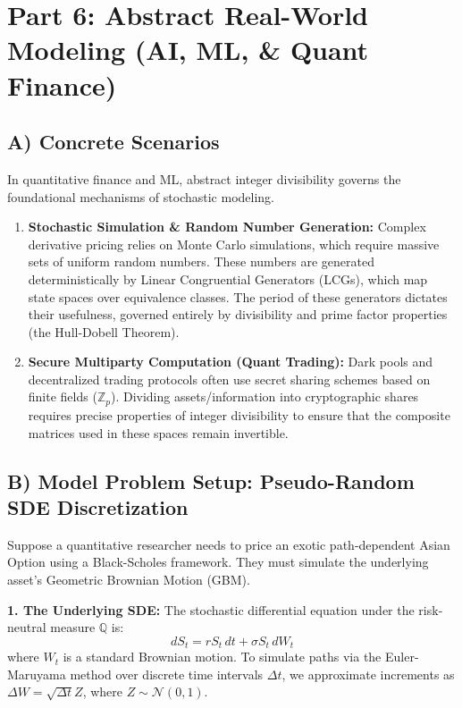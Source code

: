\documentclass[11pt]{article}
\theoremstyle{definition}
\theoremstyle{remark}
\begin{document}
\section{Part 6: Abstract Real-World Modeling (AI, ML, \& Quant Finance)}

\subsection{A) Concrete Scenarios}
In quantitative finance and ML, abstract integer divisibility governs the foundational mechanisms of stochastic modeling.
\begin{enumerate}
    \item \textbf{Stochastic Simulation \& Random Number Generation:} Complex derivative pricing relies on Monte Carlo simulations, which require massive sets of uniform random numbers. These numbers are generated deterministically by Linear Congruential Generators (LCGs), which map state spaces over equivalence classes. The period of these generators dictates their usefulness, governed entirely by divisibility and prime factor properties (the Hull-Dobell Theorem).
    \item \textbf{Secure Multiparty Computation (Quant Trading):} Dark pools and decentralized trading protocols often use secret sharing schemes based on finite fields ($\mathbb{Z}_p$). Dividing assets/information into cryptographic shares requires precise properties of integer divisibility to ensure that the composite matrices used in these spaces remain invertible.
\end{enumerate}

\subsection{B) Model Problem Setup: Pseudo-Random SDE Discretization}
Suppose a quantitative researcher needs to price an exotic path-dependent Asian Option using a Black-Scholes framework. They must simulate the underlying asset's Geometric Brownian Motion (GBM). 

\textbf{1. The Underlying SDE:}
The stochastic differential equation under the risk-neutral measure $\mathbb{Q}$ is:
\[ dS_t = r S_t \, dt + \sigma S_t \, dW_t \]
where $W_t$ is a standard Brownian motion. To simulate paths via the Euler-Maruyama method over discrete time intervals $\Delta t$, we approximate increments as $\Delta W = \sqrt{\Delta t} Z$, where $Z \sim \mathcal{N}(0,1)$.
\end{document}
